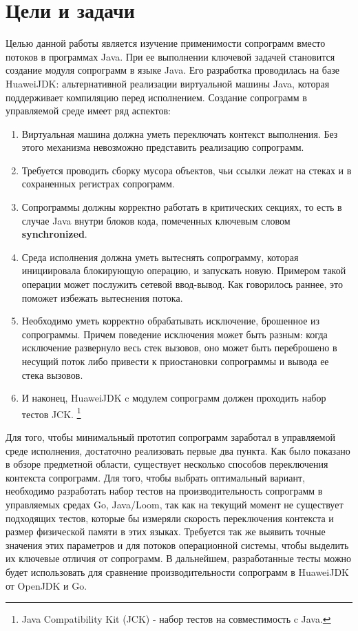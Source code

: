 \section{Цели и задачи}
	Целью данной работы является изучение применимости сопрограмм вместо потоков в программах Java. При ее выполнении ключевой задачей становится создание модуля 
	сопрограмм в языке Java.
	Его разработка проводилась на базе HuaweiJDK: альтернативной реализации виртуальной машины Java, которая поддерживает компиляцию перед исполнением. 
	Создание сопрограмм в управляемой среде имеет ряд аспектов: 
	\begin{enumerate}[align=left]
		\item Виртуальная машина должна уметь переключать контекст выполнения. Без этого механизма невозможно представить реализацию сопрограмм.
		\item Требуется проводить сборку мусора объектов, чьи ссылки лежат на стеках и в сохраненных регистрах сопрограмм. 
		\item Сопрограммы должны корректно работать в критических секциях, то есть в случае Java внутри блоков кода, помеченных ключевым словом \textbf{synchronized}.
		\item Среда исполнения должна уметь вытеснять сопрограмму, которая инициировала
		блокирующую операцию, и запускать новую. Примером такой операции может послужить
		сетевой ввод-вывод. Как говорилось раннее, это поможет избежать вытеснения потока.
		\item Необходимо уметь корректно обрабатывать исключение, брошенное из сопрограммы. Причем поведение исключения может быть разным: когда исключение
		развернуло весь стек вызовов, оно может быть переброшено в
		несущий поток либо привести к приостановки сопрограммы и вывода ее стека вызовов.
		\item И наконец, HuaweiJDK c модулем сопрограмм должен проходить набор тестов JCK.
		\footnote{Java Compatibility Kit (JCK) - набор тестов на совместимость c Java.}
	\end{enumerate}
	Для того, чтобы минимальный прототип сопрограмм заработал в управляемой среде исполнения, достаточно реализовать первые два пункта. Как было показано в обзоре предметной области, существует несколько способов
	переключения контекста сопрограмм. Для того, чтобы выбрать оптимальный вариант, необходимо разработать набор тестов на производительность сопрограмм в управляемых средах Go, Java/Loom, так как на текущий момент не
	существует подходящих тестов, которые бы измеряли скорость переключения контекста и
	размер физической памяти в этих языках.
	Требуется так же выявить точные значения этих параметров и для потоков операционной
	системы, чтобы выделить их ключевые отличия от сопрограмм.
	В дальнейшем, разработанные тесты можно будет использовать для сравнение производительности сопрограмм в HuaweiJDK от OpenJDK и Go.
	
